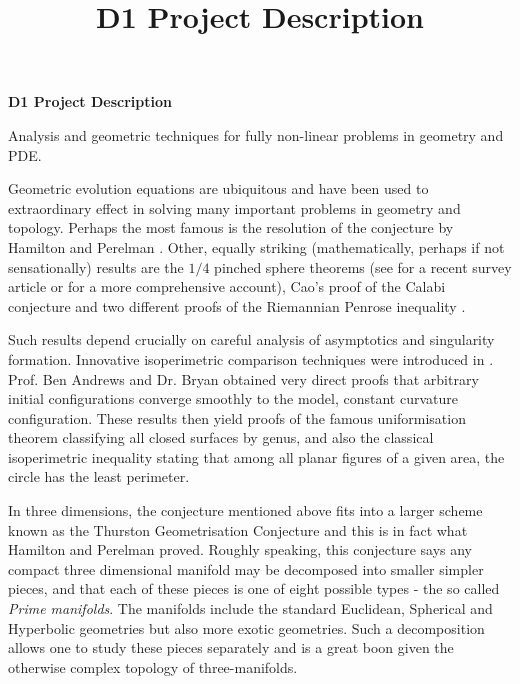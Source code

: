 \documentclass[12pt]{amsart}
\date{}
\title{D1 Project Description}
\begin{document}
\begin{center}
\textbf{D1 Project Description}
\end{center}

\label{sec:orgheadline1}
Analysis and geometric techniques for fully non-linear problems in geometry and PDE.

\smallskip{}
\label{sec:orgheadline5}
Geometric evolution equations are ubiquitous and have been used to extraordinary effect in solving many important problems in geometry and topology.  Perhaps the most famous is the resolution of the \poincare{} conjecture by Hamilton and Perelman \cite{MR2334563}.  Other, equally striking (mathematically, perhaps if not sensationally) results are the \(1/4\) pinched sphere theorems (see \cite{MR2738904} for a recent survey article or \cite{MR2760593} for a more comprehensive account), Cao's proof of the Calabi conjecture \cite{MR799272} and two different proofs of the Riemannian Penrose inequality \cite{MR1916951, MR1908823}.

Such results depend crucially on careful analysis of asymptotics and singularity formation. Innovative isoperimetric comparison techniques were introduced in \cite{MR2729306,MR2794630,MR2843240,pbthesis,Bryan}. Prof. Ben Andrews and Dr. Bryan obtained very direct proofs that arbitrary initial configurations converge smoothly to the model, constant curvature configuration. These results then yield proofs of the famous uniformisation theorem classifying all closed surfaces by genus, and also the classical isoperimetric inequality stating that among all planar figures of a given area, the circle has the least perimeter.

In three dimensions, the \poincare{} conjecture mentioned above fits into a larger scheme known as the Thurston Geometrisation Conjecture \cite{MR2334563} and this is in fact what Hamilton and Perelman proved. Roughly speaking, this conjecture says any compact three dimensional manifold may be decomposed into smaller simpler pieces, and that each of these pieces is one of eight possible types - the so called \emph{Prime manifolds}. The manifolds include the standard Euclidean, Spherical and Hyperbolic geometries but also more exotic geometries. Such a decomposition allows one to study these pieces separately and is a great boon given the otherwise complex topology of three-manifolds.
\end{document}
